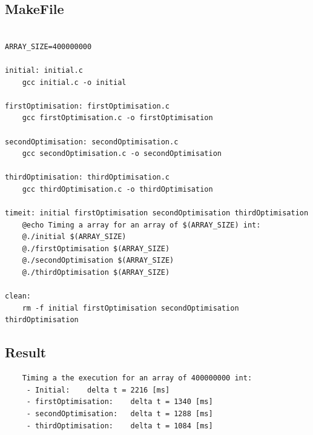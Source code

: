 \documentclass[a4paper,10pt]{article}
\begin{document}
	\subsection{MakeFile}
								\begin{lstlisting} 

ARRAY_SIZE=400000000

initial: initial.c
	gcc initial.c -o initial

firstOptimisation: firstOptimisation.c
	gcc firstOptimisation.c -o firstOptimisation

secondOptimisation: secondOptimisation.c
	gcc secondOptimisation.c -o secondOptimisation

thirdOptimisation: thirdOptimisation.c
	gcc thirdOptimisation.c -o thirdOptimisation

timeit: initial firstOptimisation secondOptimisation thirdOptimisation
	@echo Timing a array for an array of $(ARRAY_SIZE) int:
	@./initial $(ARRAY_SIZE)
	@./firstOptimisation $(ARRAY_SIZE)
	@./secondOptimisation $(ARRAY_SIZE)
	@./thirdOptimisation $(ARRAY_SIZE)

clean:
	rm -f initial firstOptimisation secondOptimisation thirdOptimisation
	\end{lstlisting}
	

	
		\subsection{Result}
\begin{lstlisting} 
	Timing a the execution for an array of 400000000 int:
	 - Initial:    delta t = 2216 [ms]
	 - firstOptimisation:    delta t = 1340 [ms]
	 - secondOptimisation:   delta t = 1288 [ms]
	 - thirdOptimisation:    delta t = 1084 [ms]
	 	\end{lstlisting}
	
	


				
\end{document}
